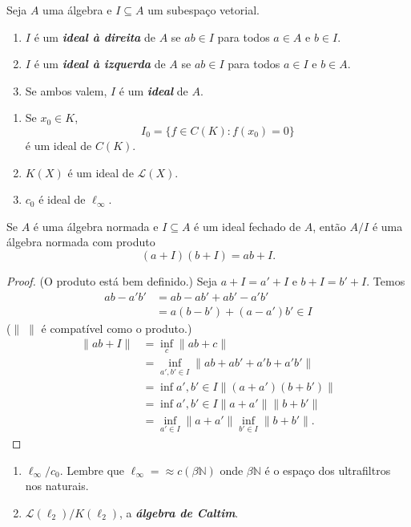 \documentclass[portuguese]{article}
\theoremstyle{definition}
\newcommand{\N}{\mathbb{N}}
\begin{document}
\begin{defn}
	Seja $A$ uma álgebra e $I\subseteq A$ um subespaço vetorial.
	\begin{enumerate}
		\item $I$ é um \textbf{\textit{ideal à direita}} de $A$ se $ab\in I$ para todos $a\in A$ e $b\in I$.
		\item $I$ é um \textbf{\textit{ideal à izquerda}} de $A$ se $ab\in I$ para todos $a\in I$ e $b\in A$.
		\item Se ambos valem, $I$ é um \textbf{\textit{ideal}} de $A$.
	\end{enumerate}
\end{defn}
\begin{exemplos}\leavevmode
	\begin{enumerate}
		\item Se $x_0\in K$,
		\[I_0=\{f\in C(K):f(x_0)=0\}\]
		é um ideal de $C(K)$.
		\item $K(X)$ é um ideal de $\mathcal{L}(X)$.
		\item $c_0$ é ideal de $\ell_\infty$.
	\end{enumerate}
\end{exemplos}
\begin{prop}
	Se $A$ é uma álgebra normada e $I\subseteq A$ é um ideal fechado de $A$, então $A/I$ é uma álgebra normada com produto
	\[(a+I)(b+I)=ab+I.\]
\end{prop}
\begin{proof}
	(O produto está bem definido.) Seja $a+I=a'+I$ e $b+I=b'+I$. Temos 
	\begin{align*}
		ab-a'b'&=ab-ab'+ab'-a'b'\\
		&=a(b-b')+(a-a')b'\in I
	\end{align*}
	($\|\;\|$ é compatível como o produto.)
	\begin{align*}
		\|ab+I\|&=\inf_c\|ab+c\|\\
		&=\inf_{a',b'\in I}\|ab+ab'+a'b+a'b'\|\\
		&=\inf{a',b'\in I}\|(a+a')(b+b')\|\\
		&=\inf{a',b'\in I}\|a+a'\|\|b+b'\|\\
		&=\inf_{a'\in I}\|a+a'\|\inf_{b'\in I}\|b+b'\|.
	\end{align*}
\end{proof}
\begin{exemplos}\leavevmode
	\begin{enumerate}
		\item $\ell_\infty/c_0$. {\color{persiangreen}Lembre que $\ell_\infty=\approx c(\beta\N)$ onde $\beta\N$ é o espaço dos ultrafiltros nos naturais.}
		\item $\mathcal{L}(\ell_2)/K(\ell_2)$, a \textbf{\textit{álgebra de Caltim}}.
	\end{enumerate}
\end{exemplos}
\end{document}
